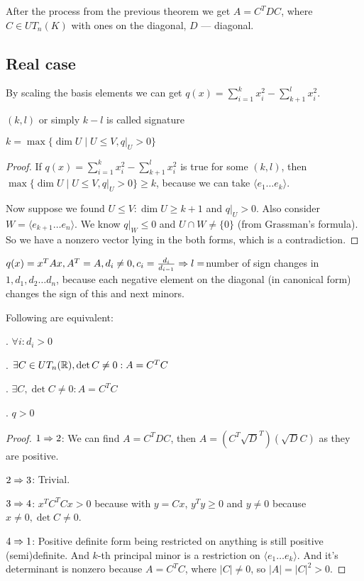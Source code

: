 \begin{thr}
    After the process from the previous theorem we get $A = C^T D C$,
    where $C \in UT_n(K)$ with ones on the diagonal, $D$ --- diagonal.
\end{thr}

\subsection*{Real case}
By scaling the basis elements we can get $q(x) = \sum_{i=1}^k x_i^2 - \sum_{k+1}^l x_i^2$. 
\begin{df} $(k, l)$ or simply $k - l$ is called signature \end{df}
\begin{thr}
    $k = \max \{ \dim U \mid U \le V, q|_U > 0 \} $
\end{thr}
\begin{proof}
    If $q(x) = \sum_{i=1}^k x_i^2 - \sum_{k+1}^l x_i^2$ is true for some $(k, l)$, then 
    $\max \{ \dim U \mid U \le V, q|_U > 0 \} \ge k$, 
    because we can take $\langle e_1 \dots e_k \rangle$.

    Now suppose we found $U \le V: \dim U \ge k + 1$ and $q|_U > 0$. Also 
    consider $W = \langle e_{k+1} \dots e_n \rangle$. We know $q|_W \le 0$ and 
    $U \cap W \ne \{ 0 \}$ (from Grassman's formula). So we have a nonzero vector lying
    in the both forms, which is a contradiction.
\end{proof}

\begin{thr}
    $q(x) = x^T A x, A^T = A, d_i \ne 0, c_i = \frac{d_i}{d_{i-1}} \Rightarrow l = $number of sign changes
    in $1, d_1, d_2 \dots d_n$, because each negative element on the diagonal (in canonical form) changes the sign of this and 
    next minors.
\end{thr}

\begin{thr} Following are equivalent:
    \par{}. $\forall i: d_i > 0$
    \par{}. $\exists C \in UT_n(\mathbb R), \det C \ne 0: A = C^TC$
    \par{}. $\exists C, \det C \ne 0: A = C^TC$
    \par{}. $q > 0$
\end{thr}
\begin{proof}
    $1 \Rightarrow 2$: We can find $A = C^T D C$, then $A = (C^T\sqrt{D}^T)(\sqrt{D}C)$
    as they are positive.

    $2 \Rightarrow 3$: Trivial.

    $3 \Rightarrow 4$: $x^TC^TCx > 0$ because with $y = Cx$, $y^Ty \ge 0$ and $y \ne 0$
    because $x \ne 0, \det C \ne 0$.

    $4 \Rightarrow 1$: Positive definite form being restricted on anything is still 
    positive (semi)definite. And $k$-th principal minor is a restriction on $\langle e_1 \dots e_k \rangle$.
    And it's determinant is nonzero because $A = C^T C$, where $|C| \ne 0$, so $|A| = |C|^2 > 0$.
\end{proof}
